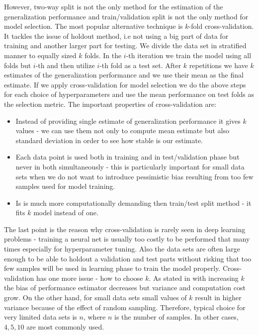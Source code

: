 \documentclass[shortabstract, english, mgr]{iithesis}
\begin{document}
However, two-way split is not the only method for the estimation of the generalization performance and train/validation split is not the only method for model selection. The most popular alternative technique is $k$-fold cross-validation. It tackles the issue of holdout method, i.e not using a big part of data for training and another larger part for testing. We divide the data set in stratified manner to equally sized $k$ folds. In the $i$-th iteration we train the model using all folds but $i$-th and then utilize $i$-th fold as a test set. After $k$ repetitions we have $k$ estimates of the generalization performance and we use their mean as the final estimate. If we apply cross-validation for model selection we do the above steps for each choice of hyperparameters and use the mean performance on test folds as the selection metric. The important properties of cross-validation are:
\begin{itemize}
    \item Instead of providing single estimate of generalization performance it gives $k$ values - we can use them not only to compute mean estimate but also standard deviation in order to see how stable is our estimate.
    \item Each data point is used both in training and in test/validation phase but never in both simultaneously - this is particularly important for small data sets when we do not want to introduce pessimistic bias resulting from too few samples used for model training.
    \item Is is much more computationally demanding then train/test split method - it fits $k$ model instead of one.
\end{itemize}
The last point is the reason why cross-validation is rarely seen in deep learning problems - training a neural net is usually too costly to be performed that many times especially for hyperparameter tuning. Also the data sets are often large enough to be able to holdout a validation and test parts without risking that too few samples will be used in learning phase to train the model properly. Cross-validation has one more issue - how to choose $k$. As stated in \cite{ModelSelection} with increasing $k$ the bias of performance estimator decreases but variance and computation cost grow. On the other hand, for small data sets small values of $k$ result in higher variance because of the effect of random sampling. Therefore, typical choice for very limited data sets is $n$, where $n$ is the number of samples. In other cases, $4,5,10$ are most commonly used.  
\end{document}
